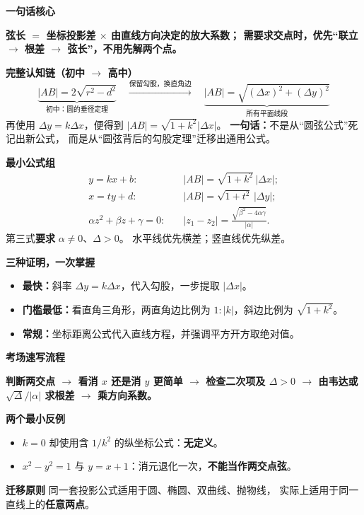 \clearpage
\begin{summarybox}
\textbf{\textcolor{CSummary}{一句话核心}}

\textbf{弦长 $=$ 坐标投影差 $\times$ 由直线方向决定的放大系数；
需要求交点时，优先“联立 $\rightarrow$ 根差 $\rightarrow$ 弦长”，不用先解两个点。}

\medskip
\textbf{\textcolor{CSummary}{完整认知链（初中 $\rightarrow$ 高中）}}
\[
 \underbrace{|AB|=2\sqrt{r^2-d^2}}_{\text{初中：圆的垂径定理}}
 \quad\xrightarrow{\text{保留勾股，换直角边}}\quad
 \underbrace{|AB|=\sqrt{(\Delta x)^2+(\Delta y)^2}}_{\text{所有平面线段}}
\]
再使用 $\Delta y=k\Delta x$，便得到
$|AB|=\sqrt{1+k^2}|\Delta x|$。
\textbf{一句话：}不是从“圆弦公式”死记出新公式，
而是从“圆弦背后的勾股定理”迁移出通用公式。

\medskip
\textbf{\textcolor{CSummary}{最小公式组}}
\[
 \boxed{\begin{aligned}
 y=kx+b:&\quad |AB|=\sqrt{1+k^2}\,|\Delta x|;\\
 x=ty+d:&\quad |AB|=\sqrt{1+t^2}\,|\Delta y|;\\
 \alpha z^2+\beta z+\gamma=0:&\quad
 |z_1-z_2|=\frac{\sqrt{\beta^2-4\alpha\gamma}}{|\alpha|}.
 \end{aligned}}
\]
第三式\textbf{要求} $\alpha\ne0$、$\Delta>0$。
水平线优先横差；竖直线优先纵差。

\medskip
\textbf{\textcolor{CSummary}{三种证明，一次掌握}}
\begin{itemize}[leftmargin=*,itemsep=0.25em]
 \item \textbf{最快：}斜率 $\Delta y=k\Delta x$，代入勾股，一步提取 $|\Delta x|$。
 \item \textbf{门槛最低：}看直角三角形，两直角边比例为 $1:|k|$，斜边比例为 $\sqrt{1+k^2}$。
 \item \textbf{常规：}坐标距离公式代入直线方程，并强调平方开方取绝对值。
\end{itemize}

\medskip
\textbf{\textcolor{CSummary}{考场速写流程}}

\textbf{判断两交点 $\rightarrow$ 看消 $x$ 还是消 $y$ 更简单
$\rightarrow$ 检查二次项及 $\Delta>0$
$\rightarrow$ 由韦达或 $\sqrt\Delta/|\alpha|$ 求根差
$\rightarrow$ 乘方向系数。}

\medskip
\textbf{\textcolor{CSummary}{两个最小反例}}
\begin{itemize}[leftmargin=*,itemsep=0.2em]
 \item $k=0$ 却使用含 $1/k^2$ 的纵坐标公式：\textbf{无定义}。
 \item $x^2-y^2=1$ 与 $y=x+1$：消元退化一次，\textbf{不能当作两交点弦}。
\end{itemize}

\textbf{\textcolor{CSummary}{迁移原则}}
同一套投影公式适用于圆、椭圆、双曲线、抛物线，
实际上适用于同一直线上的\textbf{任意两点}。
\end{summarybox}
